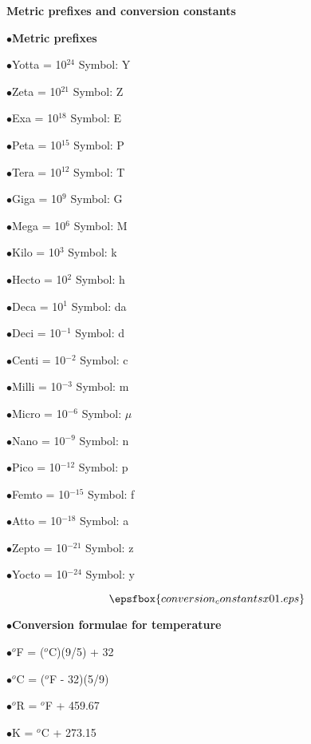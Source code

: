 


\centerline{\bf Metric prefixes and conversion constants}

\medskip 
\item{$\bullet$}{\bf Metric prefixes}
\item{$\bullet$}Yotta = 10$^{24}$ Symbol: Y
\item{$\bullet$}Zeta = 10$^{21}$ Symbol: Z
\item{$\bullet$}Exa = 10$^{18}$ Symbol: E
\item{$\bullet$}Peta = 10$^{15}$ Symbol: P
\item{$\bullet$}Tera = 10$^{12}$ Symbol: T
\item{$\bullet$}Giga = 10$^{9}$ Symbol: G
\item{$\bullet$}Mega = 10$^{6}$ Symbol: M
\item{$\bullet$}Kilo = 10$^{3}$ Symbol: k
\item{$\bullet$}Hecto = 10$^{2}$ Symbol: h
\item{$\bullet$}Deca = 10$^{1}$ Symbol: da
\item{$\bullet$}Deci = 10$^{-1}$ Symbol: d
\item{$\bullet$}Centi = 10$^{-2}$ Symbol: c
\item{$\bullet$}Milli = 10$^{-3}$ Symbol: m
\item{$\bullet$}Micro = 10$^{-6}$ Symbol: $\mu$
\item{$\bullet$}Nano = 10$^{-9}$ Symbol: n
\item{$\bullet$}Pico = 10$^{-12}$ Symbol: p
\item{$\bullet$}Femto = 10$^{-15}$ Symbol: f
\item{$\bullet$}Atto = 10$^{-18}$ Symbol: a
\item{$\bullet$}Zepto = 10$^{-21}$ Symbol: z
\item{$\bullet$}Yocto = 10$^{-24}$ Symbol: y
\medskip 

$$\epsfbox{conversion_constantsx01.eps}$$

\medskip
\goodbreak 
\item{$\bullet$}{\bf Conversion formulae for temperature}
\item{$\bullet$}$^{o}$F = ($^{o}$C)(9/5) + 32
\item{$\bullet$}$^{o}$C = ($^{o}$F - 32)(5/9)
\item{$\bullet$}$^{o}$R = $^{o}$F + 459.67
\item{$\bullet$}K = $^{o}$C + 273.15
\medskip 
\bigskip 

